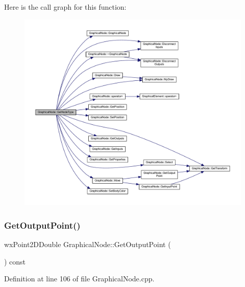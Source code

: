 Here is the call graph for this function\+:
\nopagebreak
\begin{figure}[H]
\begin{center}
\leavevmode
\includegraphics[width=350pt]{class_graphical_node_a4c5493ddcfca4d433421ae06eac1b19a_cgraph}
\end{center}
\end{figure}
\mbox{\label{class_graphical_node_a5e0a98450d511bb024e1746ab42d34c4}} 
\subsubsection{\texorpdfstring{Get\+Output\+Point()}{GetOutputPoint()}}
{\footnotesize\ttfamily wx\+Point2\+D\+Double Graphical\+Node\+::\+Get\+Output\+Point (\begin{DoxyParamCaption}{ }\end{DoxyParamCaption}) const\hspace{0.3cm}{\ttfamily [protected]}}



Definition at line 106 of file Graphical\+Node.\+cpp.

